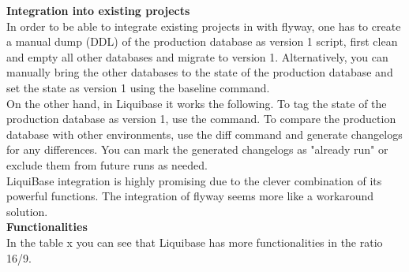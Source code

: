 \textbf{Integration into existing projects}\\
In order to be able to integrate existing projects in with flyway, one has to create a manual dump (DDL) of the production database as version 1 script, first clean and empty all other databases and migrate to version 1. Alternatively, you can manually bring the other databases to the state of the production database and set the state as version 1 using the baseline command.\\
On the other hand, in Liquibase it works the following. To tag the state of the production database as version 1, use the  command. To compare the production database with other environments, use the diff command and generate changelogs for any differences. You can mark the generated changelogs as "already run" or exclude them from future runs as needed.\\
LiquiBase integration is highly promising due to the clever combination of its powerful functions. The integration of flyway seems more like a workaround solution.\\

\textbf{Functionalities}\\
In the table x you can see that Liquibase has more functionalities in the ratio 16/9. 

